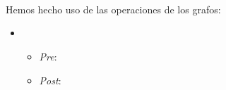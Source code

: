 \textbf{}\textit{}


\begin{verbatim}
  
\end{verbatim}


Hemos hecho uso de las operaciones de los grafos:
\begin{itemize}
  \item \verb | |
  \begin{itemize}
    \item \textit{Pre}:
    \item \textit{Post}:
  \end{itemize}
\end{itemize}